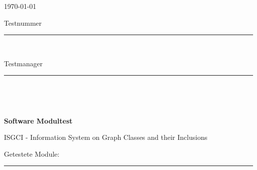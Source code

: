

\thispagestyle{empty} %


\begin{minipage}[l]{0.6\textwidth}
{\large \today}\\

{\large Testnummer \rule{1cm}{0.4pt}}\\

{\large Testmanager \rule{4cm}{0.4pt}}\\

\end{minipage}
\begin{minipage}{0.4\textwidth}
\end{minipage}\\


\vspace*{1cm} 
\begin{center}
\textbf{{\LARGE Software Modultest}}\\
\end{center}

\begin{center}
{\large ISGCI - Information System on Graph Classes and their Inclusions}\\
\end{center}

\begin{center}
{\large Getestete Module: \rule{4cm}{0.4pt}}\\
\end{center}

$ $\\

	\hspace{1cm}
\\
	

